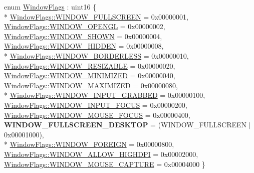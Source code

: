 \begin{DoxyCompactItemize}
\item 
enum \hyperlink{namespaceae_core_acdd369cfd195794193a8bd62815a642e}{Window\+Flags} \+: uint16 \{ \\*
\hyperlink{namespaceae_core_acdd369cfd195794193a8bd62815a642eac7cb47fe75b31167b7d8135b6d3538e7}{Window\+Flags\+::\+W\+I\+N\+D\+O\+W\+\_\+\+F\+U\+L\+L\+S\+C\+R\+E\+EN} = 0x00000001, 
\hyperlink{namespaceae_core_acdd369cfd195794193a8bd62815a642eadea4b20851100b7211bb456518feef46}{Window\+Flags\+::\+W\+I\+N\+D\+O\+W\+\_\+\+O\+P\+E\+N\+GL} = 0x00000002, 
\hyperlink{namespaceae_core_acdd369cfd195794193a8bd62815a642ea63c0e4bb4dd1394771eb32f78d9118fd}{Window\+Flags\+::\+W\+I\+N\+D\+O\+W\+\_\+\+S\+H\+O\+WN} = 0x00000004, 
\hyperlink{namespaceae_core_acdd369cfd195794193a8bd62815a642eabe3973126d0f7ab2871155232c60e694}{Window\+Flags\+::\+W\+I\+N\+D\+O\+W\+\_\+\+H\+I\+D\+D\+EN} = 0x00000008, 
\\*
\hyperlink{namespaceae_core_acdd369cfd195794193a8bd62815a642ea280b7580def4664af4655b9cfd2eb79a}{Window\+Flags\+::\+W\+I\+N\+D\+O\+W\+\_\+\+B\+O\+R\+D\+E\+R\+L\+E\+SS} = 0x00000010, 
\hyperlink{namespaceae_core_acdd369cfd195794193a8bd62815a642eafdc98c9638aa168e4127cd093f5fb669}{Window\+Flags\+::\+W\+I\+N\+D\+O\+W\+\_\+\+R\+E\+S\+I\+Z\+A\+B\+LE} = 0x00000020, 
\hyperlink{namespaceae_core_acdd369cfd195794193a8bd62815a642ea4f5800351acfd91672d23ebdbf4cbf9c}{Window\+Flags\+::\+W\+I\+N\+D\+O\+W\+\_\+\+M\+I\+N\+I\+M\+I\+Z\+ED} = 0x00000040, 
\hyperlink{namespaceae_core_acdd369cfd195794193a8bd62815a642eabd32d53c78346f06f176de017d99acce}{Window\+Flags\+::\+W\+I\+N\+D\+O\+W\+\_\+\+M\+A\+X\+I\+M\+I\+Z\+ED} = 0x00000080, 
\\*
\hyperlink{namespaceae_core_acdd369cfd195794193a8bd62815a642eadc3ae5b884772002a35117f02d180002}{Window\+Flags\+::\+W\+I\+N\+D\+O\+W\+\_\+\+I\+N\+P\+U\+T\+\_\+\+G\+R\+A\+B\+B\+ED} = 0x00000100, 
\hyperlink{namespaceae_core_acdd369cfd195794193a8bd62815a642ea7b28e867de277942e11b6f1714a4a204}{Window\+Flags\+::\+W\+I\+N\+D\+O\+W\+\_\+\+I\+N\+P\+U\+T\+\_\+\+F\+O\+C\+US} = 0x00000200, 
\hyperlink{namespaceae_core_acdd369cfd195794193a8bd62815a642ea26c33004d772f01602c9a52433ba7b16}{Window\+Flags\+::\+W\+I\+N\+D\+O\+W\+\_\+\+M\+O\+U\+S\+E\+\_\+\+F\+O\+C\+US} = 0x00000400, 
{\bfseries W\+I\+N\+D\+O\+W\+\_\+\+F\+U\+L\+L\+S\+C\+R\+E\+E\+N\+\_\+\+D\+E\+S\+K\+T\+OP} = (W\+I\+N\+D\+O\+W\+\_\+\+F\+U\+L\+L\+S\+C\+R\+E\+EN $\vert$ 0x00001000), 
\\*
\hyperlink{namespaceae_core_acdd369cfd195794193a8bd62815a642eae6c714d673eba7126eb3913a51fe847e}{Window\+Flags\+::\+W\+I\+N\+D\+O\+W\+\_\+\+F\+O\+R\+E\+I\+GN} = 0x00000800, 
\hyperlink{namespaceae_core_acdd369cfd195794193a8bd62815a642ea3ec6e3bc70c8b497aa64c31b746081d4}{Window\+Flags\+::\+W\+I\+N\+D\+O\+W\+\_\+\+A\+L\+L\+O\+W\+\_\+\+H\+I\+G\+H\+D\+PI} = 0x00002000, 
\hyperlink{namespaceae_core_acdd369cfd195794193a8bd62815a642eaad7e5439b9b863e32d197e9cebd53a30}{Window\+Flags\+::\+W\+I\+N\+D\+O\+W\+\_\+\+M\+O\+U\+S\+E\+\_\+\+C\+A\+P\+T\+U\+RE} = 0x00004000
 \}
\end{DoxyCompactItemize}
